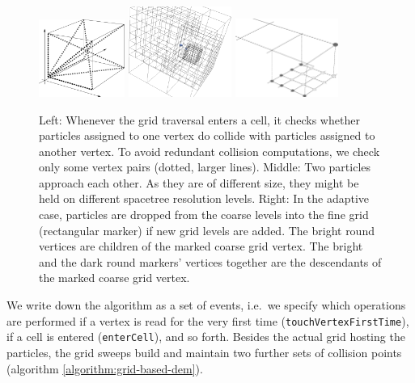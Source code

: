 \documentclass[times,12pt]{article}
\begin{document}
\begin{figure}
  \begin{center}
    \includegraphics[width=0.25\textwidth]{sketches/collision-cube.pdf}
    \hspace{0.2cm}
    \includegraphics[width=0.3\textwidth]{experiments/two-bodies/visualisation/adaptive-grid01.png}
    \hspace{0.2cm}
    \includegraphics[width=0.3\textwidth]{sketches/multigrid.pdf}
  \end{center}
  \caption{
    Left: Whenever the grid traversal enters a cell, it checks whether particles
    assigned to one vertex do collide with particles assigned to another vertex.
    To avoid redundant collision computations, we check only some vertex pairs
    (dotted, larger lines).
    Middle: Two particles approach each other. As they are of different size,
    they might be held on different spacetree resolution levels.
    Right: In the adaptive case, particles are dropped from the coarse levels
    into the fine grid (rectangular marker) if new grid levels are added. The
    bright round vertices are children of the marked coarse grid vertex. The
    bright and the dark round markers' vertices together are the descendants of
    the marked coarse grid vertex.
  }
  \label{figure:collision-cube}
\end{figure}

We write down the algorithm as a set of events, i.e.~we specify which
operations are performed if a vertex is read for the very first time \linebreak
(\texttt{touchVertexFirstTime}), if a cell is entered
(\texttt{enterCell}), and so forth.
Besides the actual grid hosting the particles, the grid sweeps build and
maintain two further sets of collision points (algorithm \ref{algorithm:grid-based-dem}).
\end{document}
